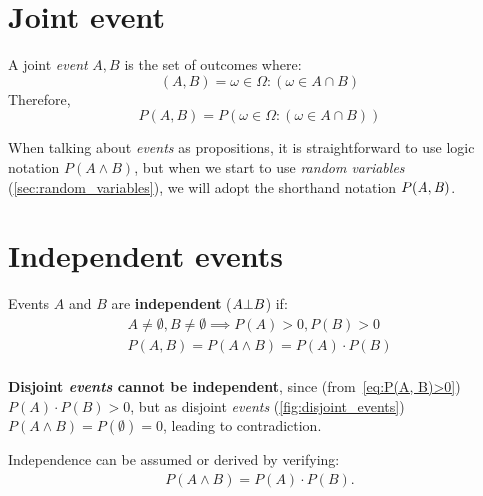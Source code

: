 \section{Joint event}
\begin{definition}
A joint \emph{event} \(A, B\) is the set of outcomes where:
\[(A, B) = {\omega \in \Omega: (\omega \in A \cap B) } \]
Therefore,
\[P(A, B) =P({\omega \in \Omega: (\omega \in A \cap B) }) \]
\end{definition}
When talking about \emph{events} as propositions, it is straightforward to use logic notation \(P(A \land B)\), but when we start to use \emph{random variables} (\cref{sec:random_variables}), we will adopt the shorthand notation \(P({\mathit{A}}, {\mathit{B}})\).

\section{Independent events}\label{sec:independent_events}
\begin{definition}\label{def:independence}
Events \(A\) and \(B\) are \textbf{independent} (\(A \bot B\)) if:
\begin{align}
A\neq \emptyset, B\neq \emptyset \implies P(A)>0, P(B)>0\label{eq:P(A, B)>0}\\
P(A, B) = P(A \land B) = P(A) \cdot P(B)\label{eq:Product_Rule}\\
\nonumber \tag{Product Rule}
\end{align}
\end{definition}

\textbf{Disjoint \emph{events} cannot be independent}, since (from~\eqref{eq:P(A, B)>0}) \(P(A) \cdot P(B)> 0\), but as disjoint \emph{events} (\cref{fig:disjoint_events}) \(P(A \land B)=P(\emptyset)=0\), leading to contradiction.

Independence can be assumed or derived by verifying:
\begin{align}
P(A \land B)= P(A) \cdot P(B).\\
\nonumber \tag{Independent variables}
\end{align}


